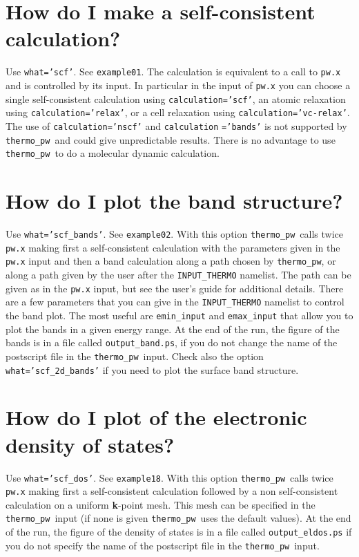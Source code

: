 \documentclass[12pt,a4paper]{article}
\def\thermo{\texttt{thermo\_pw}}
\begin{document}
\newpage
\section{\color{coral}How do I make a self-consistent calculation?}
Use \texttt{what='scf'}. See \texttt{example01}. The calculation is
equivalent to a call to \texttt{pw.x} and is controlled by
its input. In particular in the input of \texttt{pw.x} you can choose
a single self-consistent calculation using \texttt{calculation='scf'}, 
an atomic relaxation using \texttt{calculation='relax'}, or a cell relaxation 
using \texttt{calculation='vc-relax'}.
The use of \texttt{calculation='nscf'} and \texttt{calculation}
\texttt{='bands'} is
not supported by \thermo\ and could give unpredictable results.
There is no advantage to use \thermo\ to do a molecular dynamic
calculation. 

\newpage

\section{\color{coral}How do I plot the band structure?}
Use \texttt{what='scf\_bands'}. See \texttt{example02}.
With this option \thermo\ calls twice
\texttt{pw.x} making first a self-consistent calculation with the parameters
given in the \texttt{pw.x} input and then a band calculation along a 
path chosen by \thermo, or along a path given by the user
after the \texttt{INPUT\_THERMO} namelist. The path can be given as
in the \texttt{pw.x} input, but see the user's guide for additional details.
There are a few parameters that you can give in the \texttt{INPUT\_THERMO} namelist to control the band plot. The most useful are 
\texttt{emin\_input} and \texttt{emax\_input} that allow you to plot the 
bands in a given energy range. At the end of the run, the figure of the bands is
in a file called \texttt{output\_band.ps}, if you do not change the name 
of the postscript file in the \thermo\ input.
Check also the option \texttt{what='scf\_2d\_bands'} if you need
to plot the surface band structure.
\newpage

\section{\color{coral}How do I plot of the electronic density of states?}
Use \texttt{what='scf\_dos'}. See \texttt{example18}. With this option
\thermo\ calls twice \texttt{pw.x} making first a self-consistent calculation
followed by a non self-consistent calculation on a uniform {\bf k}-point mesh.
This mesh can be specified in the \thermo\ input (if none is given \thermo\ 
uses the default values). At the end of the run, the figure of the density of
states is in a file called \texttt{output\_eldos.ps} if you do not
specify the name of the postscript file in the \thermo\ input.
\newpage
\end{document}
